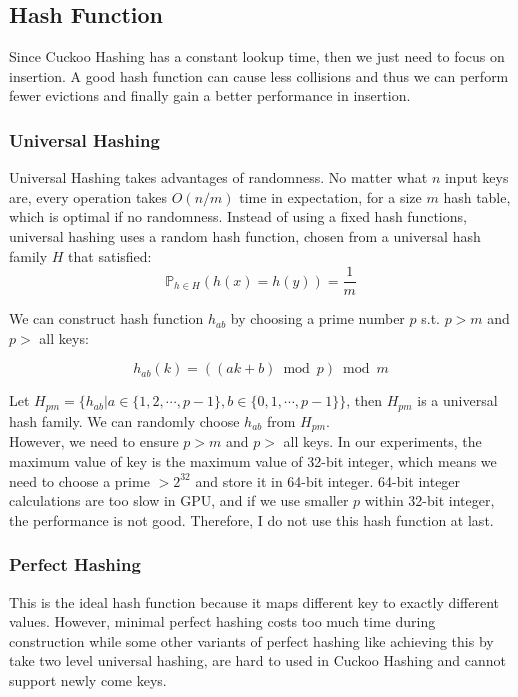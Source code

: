 \documentclass[10pt,twocolumn,letterpaper]{article}
\begin{document}
\subsection{Hash Function}

Since Cuckoo Hashing has a constant lookup time, then we just need to focus on insertion. A good hash function can cause less collisions and thus we can perform fewer evictions and finally gain a better performance in insertion.

\subsubsection{Universal Hashing}

Universal Hashing takes advantages of randomness. No matter what $n$ input keys are, every operation takes $O(n / m)$ time in expectation, for a size $m$ hash table, which is optimal if no randomness. Instead of using a fixed hash functions, universal hashing uses a random hash function, chosen from a universal hash family $H$ that satisfied:
$$\mathbb P_{h \in H}(h(x) = h(y)) = \frac 1 m$$

We can construct hash function $h_{ab}$ by choosing a prime number $p$ s.t. $p > m$ and $p > $ all keys:

$$h_{ab}(k) = ((ak + b) \bmod p) \bmod m$$

Let $H_{pm} = \{h_{ab} | a \in \{1, 2, \cdots, p - 1\}, b \in \{0, 1, \cdots, p - 1\}\}$, then $H_{pm}$ is a universal hash family. We can randomly choose $h_{ab}$ from $H_{pm}$.\\
However, we need to ensure $p > m$ and $p > $ all keys. In our experiments, the maximum value of key is the maximum value of 32-bit integer, which means we need to choose a prime $> 2^{32}$ and store it in 64-bit integer. 64-bit integer calculations are too slow in GPU, and if we use smaller $p$ within 32-bit integer, the performance is not good. Therefore, I do not use this hash function at last.

\subsubsection{Perfect Hashing}

This is the ideal hash function because it maps different key to exactly different values. However, minimal perfect hashing costs too much time during construction \cite{Chadalavada2017ImprovingCH} while some other variants of perfect hashing like achieving this by take two level universal hashing, are hard to used in Cuckoo Hashing and cannot support newly come keys.
\end{document}
